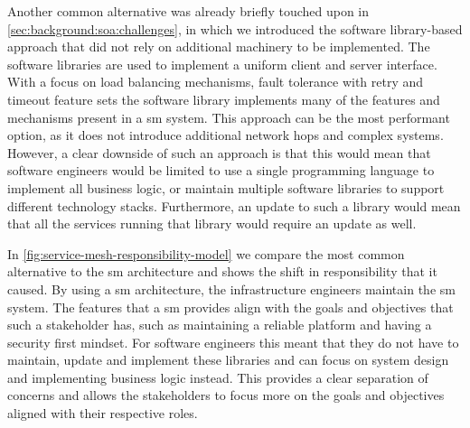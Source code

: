 Another common alternative was already briefly touched upon in  \cref{sec:background:soa:challenges}, in which we introduced the software library-based approach that did not rely on additional machinery to be implemented. The software libraries are used to implement a uniform client and server interface. With a focus on load balancing mechanisms, fault tolerance with retry and timeout feature sets the software library implements many of the features and mechanisms present in a \gls{sm} system. This approach can be the most performant option, as it does not introduce additional network hops and complex systems. However, a clear downside of such an approach is that this would mean that software engineers would be limited to use a single programming language to implement all business logic, or maintain multiple software libraries to support different technology stacks. Furthermore, an update to such a library would mean that all the services running that library would require an update as well. 

In \cref{fig:service-mesh-responsibility-model} we compare the most common alternative to the \gls{sm} architecture and shows the shift in responsibility that it caused. By using a \gls{sm} architecture, the infrastructure engineers maintain the \gls{sm} system. The features that a \gls{sm} provides align with the goals and objectives that such a stakeholder has, such as maintaining a reliable platform and having a security first mindset. For software engineers this meant that they do not have to maintain, update and implement these libraries and can focus on system design and implementing business logic instead. This provides a clear separation of concerns and allows the stakeholders to focus more on the goals and objectives aligned with their respective roles.